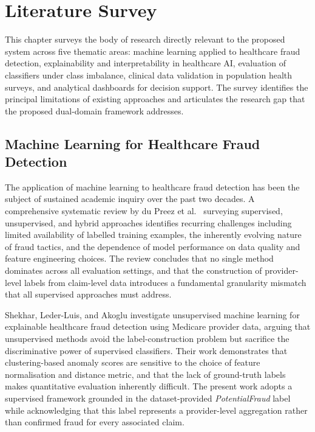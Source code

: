 \chapter{Literature Survey}
\label{ch:literature}

This chapter surveys the body of research directly relevant to the proposed system across five thematic areas: machine learning applied to healthcare fraud detection, explainability and interpretability in healthcare AI, evaluation of classifiers under class imbalance, clinical data validation in population health surveys, and analytical dashboards for decision support. The survey identifies the principal limitations of existing approaches and articulates the research gap that the proposed dual-domain framework addresses.

\section{Machine Learning for Healthcare Fraud Detection}
\label{sec:lit-fraud}

The application of machine learning to healthcare fraud detection has been the subject of sustained academic inquiry over the past two decades. A comprehensive systematic review by du Preez et al.\ \cite{b1} surveying supervised, unsupervised, and hybrid approaches identifies recurring challenges including limited availability of labelled training examples, the inherently evolving nature of fraud tactics, and the dependence of model performance on data quality and feature engineering choices. The review concludes that no single method dominates across all evaluation settings, and that the construction of provider-level labels from claim-level data introduces a fundamental granularity mismatch that all supervised approaches must address.

Shekhar, Leder-Luis, and Akoglu \cite{b2} investigate unsupervised machine learning for explainable healthcare fraud detection using Medicare provider data, arguing that unsupervised methods avoid the label-construction problem but sacrifice the discriminative power of supervised classifiers. Their work demonstrates that clustering-based anomaly scores are sensitive to the choice of feature normalisation and distance metric, and that the lack of ground-truth labels makes quantitative evaluation inherently difficult. The present work adopts a supervised framework grounded in the dataset-provided \textit{PotentialFraud} label while acknowledging that this label represents a provider-level aggregation rather than confirmed fraud for every associated claim.

